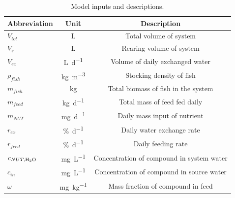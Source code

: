 \documentclass{scrartcl}
\begin{document}
\begin{table}[hbt]
\centering
  \caption{Model inputs and descriptions.}
  \vspace{5mm}
	\begin{tabular}{lcc}

\toprule
 Abbreviation & Unit & Description\\
\midrule
    
$V_{tot}$ & \si{\liter} & Total volume of system\\
$V_{r}$ & \si{\liter} & Rearing volume of system\\
$V_{ex}$ & \si{\liter\per\day} & Volume of daily exchanged water\\
$\rho_{fish}$ & \si{\kilo\gram\per\cubic\meter} & Stocking density of fish\\
$m_{fish}$ & \si{\kilo\gram} & Total biomass of fish in the system\\
$m_{feed}$ & \si{\kilo\gram\per\day} & Total mass of feed fed daily\\
$m_{NUT}$ & \si{\milli\gram\per\day} & Daily mass input of nutrient\\
$r_{ex}$ & \si{\percent\per\day} & Daily water exchange rate\\
$r_{feed}$ & \si{\percent\per\day} & Daily feeding rate\\
$c_{NUT, \ce{H2O}}$ & \si{\milli\gram\per\liter} & Concentration of compound in system water\\
$c_{in}$ & \si{\milli\gram\per\liter} & Concentration of compound in source water\\
$\omega$ & \si{\milli\gram\per\kilo\gram} & Mass fraction of compound in feed\\
\bottomrule

	\end{tabular}
\end{table}





\end{document}
